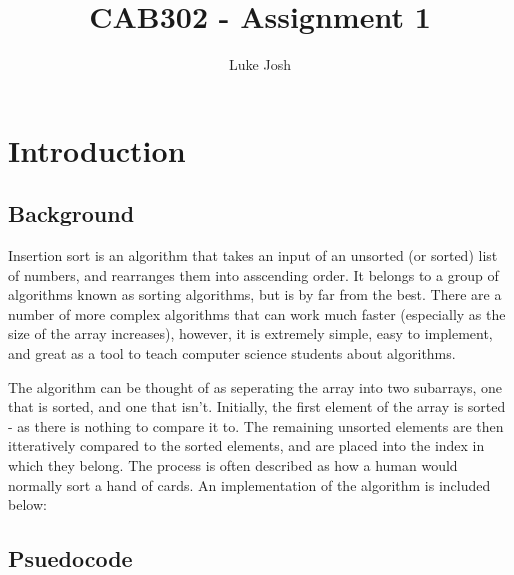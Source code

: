 \documentclass{article}
\title{CAB302 - Assignment 1}
\author{Luke Josh}
\begin{document}
\maketitle
\tableofcontents
\pagebreak

\section{Introduction}
\subsection{Background}
Insertion sort is an algorithm that takes an input of an unsorted (or sorted) list of numbers, and rearranges
them into asscending order. It belongs to a group of algorithms known as sorting algorithms, but is by far from the best.
There are a number of more complex algorithms that can work much faster (especially as the size of the array increases),
however, it is extremely simple, easy to implement, and great as a tool to teach computer science students about algorithms.

The algorithm can be thought of as seperating the array into two subarrays, one that is sorted, and one that isn't. Initially,
the first element of the array is sorted - as there is nothing to compare it to. The remaining unsorted elements are then itteratively compared
to the sorted elements, and are placed into the index in which they belong. The process is often described as how a human would normally sort a hand of cards.
An implementation of the algorithm is included below:\linebreak

\subsection{Psuedocode}
\begin{algorithmic}
    \Function{InsertionSort}{$A[0..n-1$}
            \EndWhile
        \EndFor
    \EndFunction
\end{algorithmic}
\end{document}
